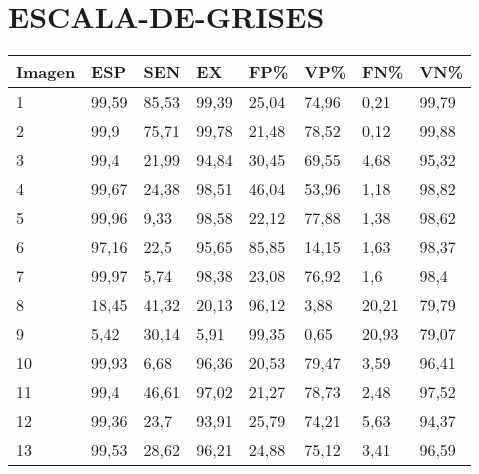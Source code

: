 \section{ESCALA-DE-GRISES}
\begin{longtable}[c]{|l|l|l|l|l|l|l|l|}
\hline
\textbf{Imagen} & \textbf{ESP} & \textbf{SEN} & \textbf{EX} & \textbf{FP\%} & \textbf{VP\%} & \textbf{FN\%} & \textbf{VN\%} \\ \hline
\endfirsthead
%
\endhead
%
1               & 99,59        & 85,53        & 99,39       & 25,04         & 74,96         & 0,21          & 99,79         \\ \hline
2               & 99,9         & 75,71        & 99,78       & 21,48         & 78,52         & 0,12          & 99,88         \\ \hline
3               & 99,4         & 21,99        & 94,84       & 30,45         & 69,55         & 4,68          & 95,32         \\ \hline
4               & 99,67        & 24,38        & 98,51       & 46,04         & 53,96         & 1,18          & 98,82         \\ \hline
5               & 99,96        & 9,33         & 98,58       & 22,12         & 77,88         & 1,38          & 98,62         \\ \hline
6               & 97,16        & 22,5         & 95,65       & 85,85         & 14,15         & 1,63          & 98,37         \\ \hline
7               & 99,97        & 5,74         & 98,38       & 23,08         & 76,92         & 1,6           & 98,4          \\ \hline
8               & 18,45        & 41,32        & 20,13       & 96,12         & 3,88          & 20,21         & 79,79         \\ \hline
9               & 5,42         & 30,14        & 5,91        & 99,35         & 0,65          & 20,93         & 79,07         \\ \hline
10              & 99,93        & 6,68         & 96,36       & 20,53         & 79,47         & 3,59          & 96,41         \\ \hline
11              & 99,4         & 46,61        & 97,02       & 21,27         & 78,73         & 2,48          & 97,52         \\ \hline
12              & 99,36        & 23,7         & 93,91       & 25,79         & 74,21         & 5,63          & 94,37         \\ \hline
13              & 99,53        & 28,62        & 96,21       & 24,88         & 75,12         & 3,41          & 96,59         \\ \hline

\end{longtable}
